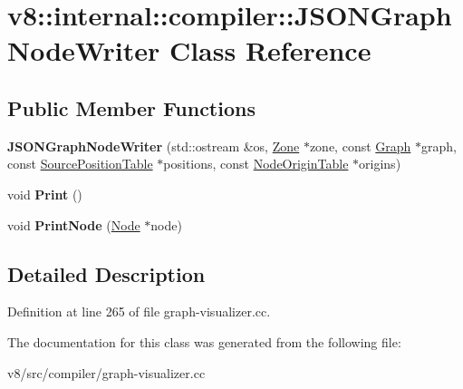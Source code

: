 \hypertarget{classv8_1_1internal_1_1compiler_1_1JSONGraphNodeWriter}{}\section{v8\+:\+:internal\+:\+:compiler\+:\+:J\+S\+O\+N\+Graph\+Node\+Writer Class Reference}
\label{classv8_1_1internal_1_1compiler_1_1JSONGraphNodeWriter}
\subsection*{Public Member Functions}
\begin{DoxyCompactItemize}
\item 
\mbox{\label{classv8_1_1internal_1_1compiler_1_1JSONGraphNodeWriter_a53adf8f13088cf8b22c81383eff346eb}} 
{\bfseries J\+S\+O\+N\+Graph\+Node\+Writer} (std\+::ostream \&os, \mbox{\hyperlink{classv8_1_1internal_1_1Zone}{Zone}} $\ast$zone, const \mbox{\hyperlink{classv8_1_1internal_1_1compiler_1_1Graph}{Graph}} $\ast$graph, const \mbox{\hyperlink{classv8_1_1internal_1_1compiler_1_1SourcePositionTable}{Source\+Position\+Table}} $\ast$positions, const \mbox{\hyperlink{classv8_1_1internal_1_1compiler_1_1NodeOriginTable}{Node\+Origin\+Table}} $\ast$origins)
\item 
\mbox{\label{classv8_1_1internal_1_1compiler_1_1JSONGraphNodeWriter_ad9109769d2da824469bfdc3d1363da89}} 
void {\bfseries Print} ()
\item 
\mbox{\label{classv8_1_1internal_1_1compiler_1_1JSONGraphNodeWriter_a726e1ae8ff6c2023632ef88447c943fa}} 
void {\bfseries Print\+Node} (\mbox{\hyperlink{classv8_1_1internal_1_1compiler_1_1Node}{Node}} $\ast$node)
\end{DoxyCompactItemize}


\subsection{Detailed Description}


Definition at line 265 of file graph-\/visualizer.\+cc.



The documentation for this class was generated from the following file\+:\begin{DoxyCompactItemize}
\item 
v8/src/compiler/graph-\/visualizer.\+cc\end{DoxyCompactItemize}
